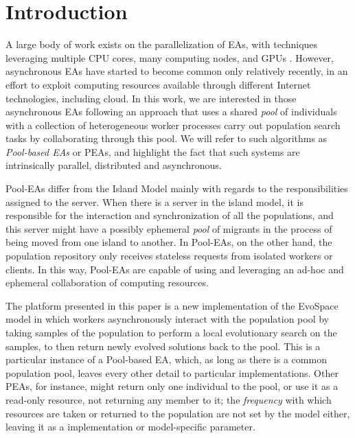 \section{Introduction}
A large body of work exists on the parallelization of EAs,
with techniques leveraging multiple CPU cores, many computing nodes, 
and GPUs \cite{muhlenbein1989parallel,cantu2000efficient,hofmann2013performance}. 
However, asynchronous EAs
\cite{Jini:FEA2000,alba2001analyzing,EvoStar2014:jsEO,jj:2008:PPSN} have
started to become common only relatively
recently, in an effort to exploit computing resources available
through different Internet technologies, including cloud. In this work, we are
interested in those asynchronous EAs following an approach that uses a
shared {\em pool} of individuals with a collection of heterogeneous worker processes 
carry out population search tasks by collaborating through this pool. We will refer to such algorithms 
as {\em Pool-based EAs} or PEAs, and highlight the fact that 
such systems are intrinsically parallel, distributed and asynchronous.

Pool-EAs differ from the  Island Model
mainly with regards to the responsibilities assigned to 
the server. When there is a server in the island model, it is 
responsible for the interaction and synchronization of 
all the populations, and this server might have a possibly ephemeral
{\em pool} of migrants in the process of being moved from one island
to another.  In Pool-EAs, on the other hand, the population repository only 
receives stateless requests from isolated workers 
or clients. In this way, Pool-EAs are capable of using and leveraging an 
ad-hoc and ephemeral collaboration of computing resources. 

The platform presented in this paper is a new implementation 
of the EvoSpace model \cite{GValdez2015} in which 
workers asynchronously interact with the population 
pool by taking samples of the population 
to perform a local evolutionary search on the samples, 
to then return newly evolved solutions back to the pool. This is a
particular instance of a Pool-based EA, which, as long as there is a
common population pool, leaves every other detail to particular
implementations. Other PEAs, for instance, might return only one
individual to the pool, or use it as a read-only resource, not
returning any member to it; the {\em frequency} with which resources
are taken or returned to the population are not set by the model
either, leaving it as a implementation or model-specific parameter. %

